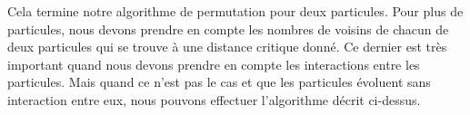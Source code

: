 \documentclass[11pt]{article}
\theoremstyle{definition}
\theoremstyle{remark}
\begin{document}
Cela termine notre algorithme de permutation pour deux particules. Pour plus de particules, nous devons prendre en compte les nombres de voisins de chacun de deux particules qui se trouve à une distance critique donné. Ce dernier est très important quand nous devons prendre en compte les interactions entre les particules. Mais quand ce n'est pas le cas et que les particules évoluent sans interaction entre eux, nous pouvons effectuer l'algorithme décrit ci-dessus. 
\end{document}
